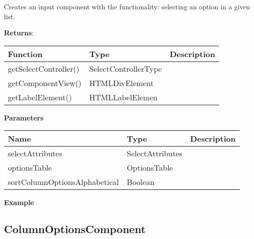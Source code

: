 \vspace*{6pt}
Creates an input component with the functionality: selecting an option in a given list. 

\vspace*{18pt}
\noindent
\textbf{Returns}: 

\begin{table}[!htb] 
    \label{api:selectComponentByTableValuesReturn}
    \footnotesize
    \setlength\extrarowheight{4pt}
    \begin{tabular}{ p{3.5cm} p{3.5cm} p{6cm} }
        \toprule[1.2pt]
        \textbf{Function}     & \textbf{Type}        & \textbf{Description} \\
        \midrule
        getSelectController() & SelectControllerType &  \\
        getComponentView()    & HTMLDivElement       &  \\
        getLabelElement()     & HTMLLabelElemen      &  \\
        \bottomrule[1.2pt]
    \end{tabular}
\end{table}

\vspace*{6pt}
\noindent
\textbf{Parameters}

\begin{table}[!htb] 
    \label{api:selectComponentByTableValuesParameter}
    \footnotesize
    \setlength\extrarowheight{4pt}
    \begin{tabular}{ p{4.5cm} p{3cm} p{5.5cm} }
        \toprule[1.2pt]
        \textbf{Name}                 & \textbf{Type}    & \textbf{Description} \\
        \midrule
        selectAttributes              & SelectAttributes &  \\
        optionsTable                  & OptionsTable     &  \\
        sortColumnOptionsAlphabetical & Boolean          &  \\
        \bottomrule[1.2pt]
    \end{tabular}
\end{table}

\vspace*{6pt}
\noindent
\textbf{Example}

\clearpage
\subsection*{ColumnOptionsComponent}

